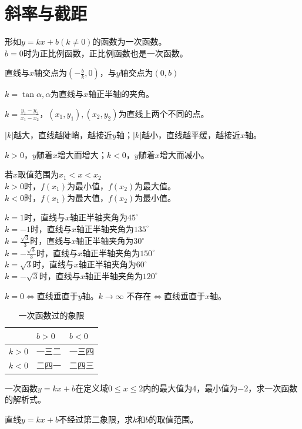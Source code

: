 \documentclass{ecnuthesis}
\begin{document}
\section{斜率与截距}
\begin{definition}
    形如$y=kx+b(k\ne 0)$的函数为一次函数。\\
    $b=0$时为正比例函数，正比例函数也是一次函数。
\end{definition}
\begin{knowledge}
    直线与$x$轴交点为$(-\frac{b}{k},0)$，与$y$轴交点为$(0,b)$
\end{knowledge}
\begin{knowledge}
    $k=\tan \alpha,\alpha$为直线与$x$轴正半轴的夹角。
\end{knowledge}
\begin{knowledge}
    $k=\frac{y_1-y_2}{x_1-x_2}$，$(x_1,y_1),(x_2,y_2)$为直线上两个不同的点。
\end{knowledge}
\begin{knowledge}
    $|k|$越大，直线越陡峭，越接近$y$轴；$|k|$越小，直线越平缓，越接近$x$轴。
\end{knowledge}
\begin{knowledge}
    $k>0$，$y$随着$x$增大而增大；$k<0$，$y$随着$x$增大而减小。
\end{knowledge}
\begin{knowledge}
    若$x$取值范围为$x_1<x<x_2$ \\
    $k>0$时，$f(x_1)$为最小值，$f(x_2)$为最大值。 \\
    $k<0$时，$f(x_1)$为最大值，$f(x_2)$为最小值。
\end{knowledge}
\begin{corollary}
    $k=1$时，直线与$x$轴正半轴夹角为$45^\circ$ \\
    $k=-1$时，直线与$x$轴正半轴夹角为$135^\circ$ \\
    $k=\frac{\sqrt3}{3}$时，直线与$x$轴正半轴夹角为$30^\circ$ \\
    $k=-\frac{\sqrt3}{3}$时，直线与$x$轴正半轴夹角为$150^\circ$ \\
    $k=\sqrt3$时，直线与$x$轴正半轴夹角为$60^\circ$ \\
    $k=-\sqrt3$时，直线与$x$轴正半轴夹角为$120^\circ$
\end{corollary}
\begin{corollary}
    $k=0\Leftrightarrow$直线垂直于$y$轴。$k\to \infty$ 不存在$\Leftrightarrow$直线垂直于$x$轴。
\end{corollary}
\begin{table}[ht]
\centering
\caption{一次函数过的象限}
\begin{tabular}{l|l|l}
 & $b>0$ & $b<0$ \\
\hline
$k>0$ & 一三二 & 一三四 \\
\hline
$k<0$ & 二四一 & 二四三 \\
\hline
\end{tabular}
\end{table}
\begin{problem}
    一次函数$y=kx+b$在定义域$0\le x \le 2$内的最大值为$4$，最小值为$−2$，求一次函数的解析式。
\end{problem}
\begin{problem}
    直线$y=kx+b$不经过第二象限，求$k$和$b$的取值范围。
\end{problem}
\clearpage
\end{document}
